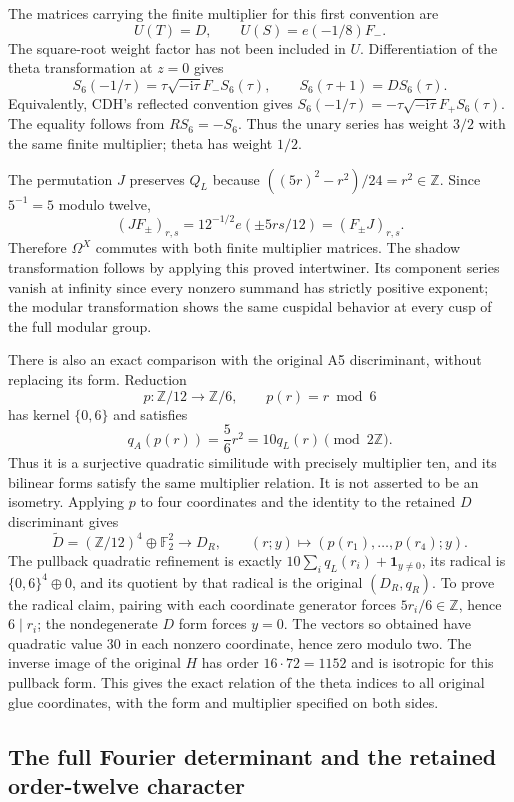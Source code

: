 The matrices carrying the finite multiplier for this first convention are
\[
 U(T)=D,\qquad U(S)=e(-1/8)F_-.
\]
The square-root weight factor has not been included in $U$.
Differentiation of the theta transformation at $z=0$ gives
\[
 S_6(-1/\tau)=\tau\sqrt{-\mathrm i\tau}F_-S_6(\tau),\qquad
 S_6(\tau+1)=D S_6(\tau).
\]
Equivalently, CDH's reflected convention gives
$S_6(-1/\tau)=-\tau\sqrt{-\mathrm i\tau}F_+S_6(\tau)$.
The equality follows from $RS_6=-S_6$.  Thus the unary series has weight
$3/2$ with the same finite multiplier; theta has weight $1/2$.

The permutation $J$ preserves $Q_L$ because
$((5r)^2-r^2)/24=r^2\in\mathbb Z$.  Since $5^{-1}=5$ modulo twelve,
\[
 (JF_\pm)_{r,s}=12^{-1/2}e(\pm5rs/12)
 =(F_\pm J)_{r,s}.
\]
Therefore $\Omega^X$ commutes with both finite multiplier matrices.
The shadow transformation follows by applying this proved intertwiner.
Its component series vanish at infinity since every nonzero summand has
strictly positive exponent; the modular transformation shows the same
cuspidal behavior at every cusp of the full modular group.

There is also an exact comparison with the original A5 discriminant,
without replacing its form.  Reduction
\[
 p:\mathbb Z/12\longrightarrow\mathbb Z/6,\qquad p(r)=r\bmod6
\]
has kernel $\{0,6\}$ and satisfies
\[
 q_A(p(r))=\frac56r^2=10q_L(r)\pmod{2\mathbb Z}.
\]
Thus it is a surjective quadratic similitude with precisely multiplier
ten, and its bilinear forms satisfy the same multiplier relation.
It is not asserted to be an isometry.  Applying $p$ to four coordinates
and the identity to the retained $D$ discriminant gives
\[
 \widetilde D=(\mathbb Z/12)^4\oplus\mathbb F_2^2
 \longrightarrow D_R,
 \qquad (r;y)\longmapsto(p(r_1),\ldots,p(r_4);y).
\]
The pullback quadratic refinement is exactly
$10\sum_iq_L(r_i)+\mathbf1_{y\ne0}$, its radical is
$\{0,6\}^4\oplus0$, and its quotient by that radical is the original
$(D_R,q_R)$.  To prove the radical claim, pairing with each coordinate
generator forces $5r_i/6\in\mathbb Z$, hence $6\mid r_i$; the
nondegenerate $D$ form forces $y=0$.  The vectors so obtained have
quadratic value $30$ in each nonzero coordinate, hence zero modulo two.
The inverse image of the original $H$ has order $16\cdot72=1152$ and
is isotropic for this pullback form.  This gives the exact relation of the
theta indices to all original glue coordinates, with the form and
multiplier specified on both sides.

\subsection{The full Fourier determinant and the retained order-twelve character}
\label{nus:subsec:determinant}

